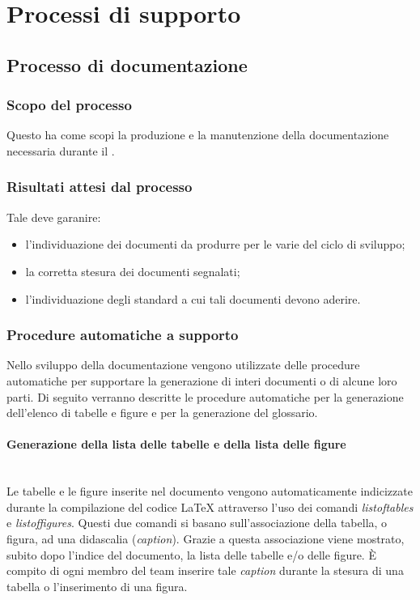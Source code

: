 \section{Processi di supporto}
\subsection{Processo di documentazione}


\subsubsection{Scopo del processo}
Questo  ha come scopi la produzione e la manutenzione della documentazione necessaria durante il .
\subsubsection{Risultati attesi dal processo}
Tale  deve garanire:
\begin{itemize}
\item l'individuazione dei documenti da produrre per le varie  del ciclo di sviluppo;
\item la corretta stesura dei documenti segnalati;
\item l'individuazione degli standard a cui tali documenti devono aderire.
\end{itemize}

\subsubsection{Procedure automatiche a supporto}
Nello sviluppo della documentazione vengono utilizzate delle procedure automatiche per supportare la generazione di interi documenti o di alcune loro parti. Di seguito verranno descritte le procedure automatiche per la generazione dell'elenco di tabelle e figure e per la generazione del glossario.
\paragraph{Generazione della lista delle tabelle e della lista delle figure} \mbox{} \\
Le tabelle e le figure inserite nel documento vengono automaticamente indicizzate durante la compilazione del codice \LaTeX{} attraverso l'uso dei comandi \textit{listoftables} e \textit{listoffigures}. Questi due comandi si basano sull'associazione della tabella, o figura, ad una didascalia (\textit{caption}). Grazie a questa associazione viene mostrato, subito dopo l'indice del documento, la lista delle tabelle e/o delle figure. È compito di ogni membro del team inserire tale \textit{caption} durante la stesura di una tabella o l'inserimento di una figura.

